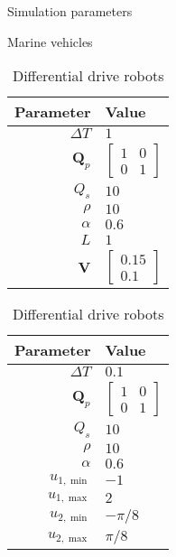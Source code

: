 \begin{table}[b]
    \begin{center}
    \captionsetup{width=.48\textwidth}
    \caption{Simulation parameters} \label{tab:params}
    
    \begin{subtable}[t]{0.22\textwidth}
        \caption{Marine vehicles}
        \label{tab:ASV}
        
        \begin{tabular}[t]{r|l}
            {\bf Parameter} & {\bf Value} \\
            \hline
            $\Delta T$ & $1$ \\
            $\bm{Q}_p$ & $\begin{bmatrix} 1 & 0 \\ 0 & 1 \end{bmatrix}$ \\
            $Q_s$ & $10$ \\
            $\rho$ & $10$ \\
            $\alpha$ & $0.6$ \\
            $L$ & $1$ \\
            $\bm{V}$ & $\begin{bmatrix} 0.15 \\ 0.1 \end{bmatrix}$
        \end{tabular}
    \end{subtable}
    \begin{subtable}[t]{0.22\textwidth}
        \caption{Differential drive robots}
        \label{tab:unicycle}
        
        \begin{tabular}[t]{r|l}
            {\bf Parameter} & {\bf Value} \\
            \hline
            $\Delta T$ & $0.1$ \\
            $\bm{Q}_p$ & $\begin{bmatrix} 1 & 0 \\ 0 & 1 \end{bmatrix}$ \\
            $Q_s$ & $10$ \\
            $\rho$ & $10$ \\
            $\alpha$ & $0.6$ \\
            $u_{1, \min}$ & $-1$ \\
            $u_{1, \max}$ & $2$ \\
            $u_{2, \min}$ & $-\pi / 8$ \\
            $u_{2, \max}$ & $\pi / 8$
        \end{tabular}
    \end{subtable}
    \end{center}
\end{table}

